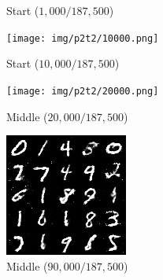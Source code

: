 \documentclass{article}
\begin{document}
\begin{figure}[!htbp]
\begin{subfigure}[b]{0.3\textwidth}
    \caption{Start ($1,000/187,500$)}
  \end{subfigure}
  \begin{subfigure}[b]{0.3\textwidth}
    \texttt{[image: img/p2t2/10000.png]}
    \caption{Start ($10,000/187,500$)}
  \end{subfigure}
  \begin{subfigure}[b]{0.3\textwidth}
    \texttt{[image: img/p2t2/20000.png]}
    \caption{Middle ($20,000/187,500$)}
  \end{subfigure}
  \begin{subfigure}[b]{0.3\textwidth}
    \includegraphics[width=\textwidth]{img/p2t2/90000.png}
    \caption{Middle ($90,000/187,500$)}
  \end{subfigure}
  \begin{subfigure}[b]{0.3\textwidth}

\end{subfigure}
\end{figure}
\end{document}
